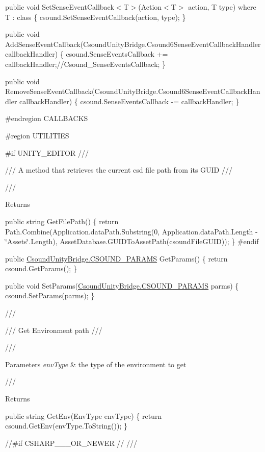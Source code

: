 public void Set\+Sense\+Event\+Callback$<$\+T$>$(\+Action$<$\+T$>$ action, T type) where T \+: class \{ csound.\+Set\+Sense\+Event\+Callback(action, type); \}

public void Add\+Sense\+Event\+Callback(Csound\+Unity\+Bridge.\+Csound6\+Sense\+Event\+Callback\+Handler callback\+Handler) \{ csound.\+Sense\+Events\+Callback += callback\+Handler;//\+Csound\+\_\+\+Sense\+Events\+Callback; \}

public void Remove\+Sense\+Event\+Callback(Csound\+Unity\+Bridge.\+Csound6\+Sense\+Event\+Callback\+Handler callback\+Handler) \{ csound.\+Sense\+Events\+Callback -\/= callback\+Handler; \}

\#endregion CALLBACKS

\#region UTILITIES

\#if UNITY\+\_\+\+EDITOR /// 

/// A method that retrieves the current csd file path from its GUID /// 

/// \begin{DoxyReturn}{Returns}

\end{DoxyReturn}
public string Get\+File\+Path() \{ return Path.\+Combine(Application.\+data\+Path.\+Substring(0, Application.\+data\+Path.\+Length -\/ \char`\"{}\+Assets\char`\"{}.Length), Asset\+Database.\+GUIDTo\+Asset\+Path(csound\+File\+GUID)); \} \#endif

public \mbox{\hyperlink{class_csound_unity_bridge_1_1_c_s_o_u_n_d___p_a_r_a_m_s}{Csound\+Unity\+Bridge.\+CSOUND\+\_\+\+PARAMS}} Get\+Params() \{ return csound.\+Get\+Params(); \}

public void Set\+Params(\mbox{\hyperlink{class_csound_unity_bridge_1_1_c_s_o_u_n_d___p_a_r_a_m_s}{Csound\+Unity\+Bridge.\+CSOUND\+\_\+\+PARAMS}} parms) \{ csound.\+Set\+Params(parms); \}

/// 

/// Get Environment path /// 

/// 
\begin{DoxyParams}{Parameters}
{\em env\+Type} & the type of the environment to get\\
\hline
\end{DoxyParams}
/// \begin{DoxyReturn}{Returns}

\end{DoxyReturn}
public string Get\+Env(\+Env\+Type env\+Type) \{ return csound.\+Get\+Env(env\+Type.\+To\+String()); \}

//\#if CSHARP\+\_\+\_\+\_\+\+OR\+\_\+\+NEWER // /// 

